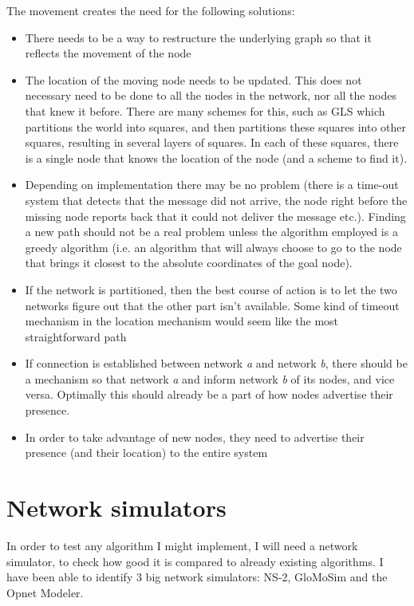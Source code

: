 \documentclass[letter, 12pt, english, draft]{article}
\begin{document}
The movement creates the need for the following solutions:
\begin{itemize}
\item There needs to be a way to restructure the underlying graph so that it reflects the movement of the node \cite{practical}
\item The location of the moving node needs to be updated. This does not necessary need to be done to all the nodes in the network, nor all the nodes that knew it before. There are many schemes for this, such as GLS \cite{scaleLocation} which partitions the world into squares, and then partitions these squares into other squares, resulting in several layers of squares. In each of these squares, there is a single node that knows the location of the node (and a scheme to find it).
\item Depending on implementation there may be no problem (there is a time-out system that detects that the message did not arrive, the node right before the missing node reports back that it could not deliver the message etc.). Finding a new path should not be a real problem unless the algorithm employed is a greedy algorithm (i.e. an algorithm that will always choose to go to the node that brings it closest to the absolute coordinates of the goal node).
\item If the network is partitioned, then the best course of action is to let the two networks figure out that the other part isn't available. Some kind of timeout mechanism in the location mechanism would seem like the most straightforward path
\item If connection is established between network \emph{a} and network \emph{b}, there should be a mechanism so that network \emph{a} and inform network \emph{b} of its nodes, and vice versa. Optimally this should already be a part of how nodes advertise their presence.
\item In order to take advantage of new nodes, they need to advertise their presence (and their location) to the entire system 
\end{itemize}

\section{Network simulators}

In order to test any algorithm I might implement, I will need a network simulator, to check how good it is compared to already existing algorithms. I have been able to identify 3 big network simulators: NS-2, GloMoSim and the Opnet Modeler.
\end{document}
